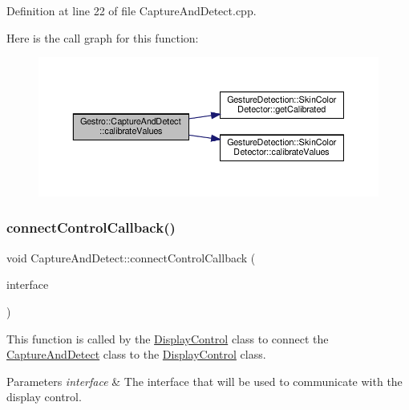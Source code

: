 Definition at line 22 of file Capture\+And\+Detect.\+cpp.

Here is the call graph for this function\+:
\nopagebreak
\begin{figure}[H]
\begin{center}
\leavevmode
\includegraphics[width=350pt]{class_gestro_1_1_capture_and_detect_aafb4f601f860dd38f514f6dd29a1d016_cgraph}
\end{center}
\end{figure}
\mbox{\label{class_gestro_1_1_capture_and_detect_aa75e3ba836797d18aa02c72bbf975082}} 
\subsubsection{\texorpdfstring{connect\+Control\+Callback()}{connectControlCallback()}}
{\footnotesize\ttfamily void Capture\+And\+Detect\+::connect\+Control\+Callback (\begin{DoxyParamCaption}\item[{\hyperlink{class_gestro_1_1_display_control_callback_interface}{Display\+Control\+Callback\+Interface} $\ast$}]{interface }\end{DoxyParamCaption})}

This function is called by the \hyperlink{class_gestro_1_1_display_control}{Display\+Control} class to connect the \hyperlink{class_gestro_1_1_capture_and_detect}{Capture\+And\+Detect} class to the \hyperlink{class_gestro_1_1_display_control}{Display\+Control} class.


\begin{DoxyParams}{Parameters}
{\em interface} & The interface that will be used to communicate with the display control. \\
\hline
\end{DoxyParams}


